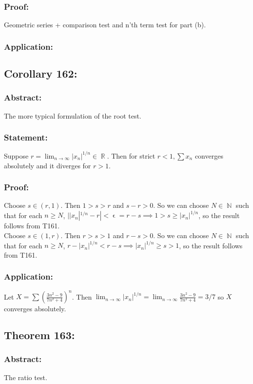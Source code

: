 \documentclass{article}
\DeclareMathOperator\eps{\epsilon}
\DeclareMathOperator\R{\mathbb{R}}
\DeclareMathOperator\N{\mathbb{N}}
\begin{document}
\subsubsection*{Proof:}
Geometric series + comparison test and n'th term test for part (b).
\subsubsection*{Application:}

\subsection{Corollary 162:}
\subsubsection*{Abstract:}
The more typical formulation of the root test.
\subsubsection*{Statement:}
Suppose $r = \lim_{n \to \infty}|x_n|^{1 \slash n} \in \R$. Then
for strict $r<1, \sum x_n$ converges absolutely and it diverges for $r>1$.
\subsubsection*{Proof:}
Choose $s \in (r,1)$. Then $1>s>r$ and $s-r > 0$. So we can choose $N \in \N$
such that for each $n \geq N$, $||x_n|^{1 \slash n} - r| < \eps = r-s \implies 1 > s \geq |x_n|^{1 \slash n} $, so the result
follows from T161. \\
\newline
Choose $s \in (1,r)$. Then $r>s>1$ and $r-s > 0$. So we can choose $N \in \N$
such that for each $n \geq N$, $r-|x_n|^{1 \slash n} < r-s \implies |x_n|^{1 \slash n} \geq s > 1$, so the result
follows from T161.
\subsubsection*{Application:}
Let $X = \sum (\frac{3n^2-9}{7n^2+4})^n$. Then
$\lim_{n \to \infty}|x_n|^{1 \slash n} = \lim_{n \to \infty}\frac{3n^2-9}{7n^2+4} = 3 \slash 7$
so $X$ converges absolutely.
\subsection{Theorem 163:}
\subsubsection*{Abstract:}
The ratio test.
\end{document}
